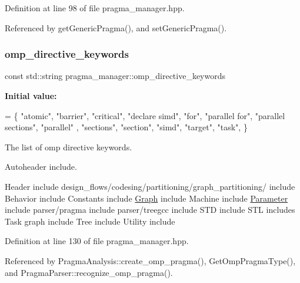 Definition at line 98 of file pragma\+\_\+manager.\+hpp.



Referenced by get\+Generic\+Pragma(), and set\+Generic\+Pragma().

\mbox{\label{classpragma__manager_ae98fee9f9beb214e7945b0b4eeb69522}} 
\subsubsection{\texorpdfstring{omp\+\_\+directive\+\_\+keywords}{omp\_directive\_keywords}}
{\footnotesize\ttfamily const std\+::string pragma\+\_\+manager\+::omp\+\_\+directive\+\_\+keywords\hspace{0.3cm}{\ttfamily [static]}}

{\bfseries Initial value\+:}
\begin{DoxyCode}
= \{
    \textcolor{stringliteral}{"atomic"}, \textcolor{stringliteral}{"barrier"}, \textcolor{stringliteral}{"critical"}, \textcolor{stringliteral}{"declare simd"}, \textcolor{stringliteral}{"for"}, \textcolor{stringliteral}{"parallel for"}, \textcolor{stringliteral}{"parallel sections"}, \textcolor{stringliteral}{"parallel"}
      , \textcolor{stringliteral}{"sections"}, \textcolor{stringliteral}{"section"}, \textcolor{stringliteral}{"simd"}, \textcolor{stringliteral}{"target"}, \textcolor{stringliteral}{"task"},
\}
\end{DoxyCode}


The list of omp directive keywords. 

Autoheader include.

Header include design\+\_\+flows/codesing/partitioning/graph\+\_\+partitioning/ include Behavior include Constants include \hyperlink{structGraph}{Graph} include Machine include \hyperlink{classParameter}{Parameter} include parser/pragma include parser/treegcc include S\+TD include S\+TL includes Task graph include Tree include Utility include 

Definition at line 130 of file pragma\+\_\+manager.\+hpp.



Referenced by Pragma\+Analysis\+::create\+\_\+omp\+\_\+pragma(), Get\+Omp\+Pragma\+Type(), and Pragma\+Parser\+::recognize\+\_\+omp\+\_\+pragma().

